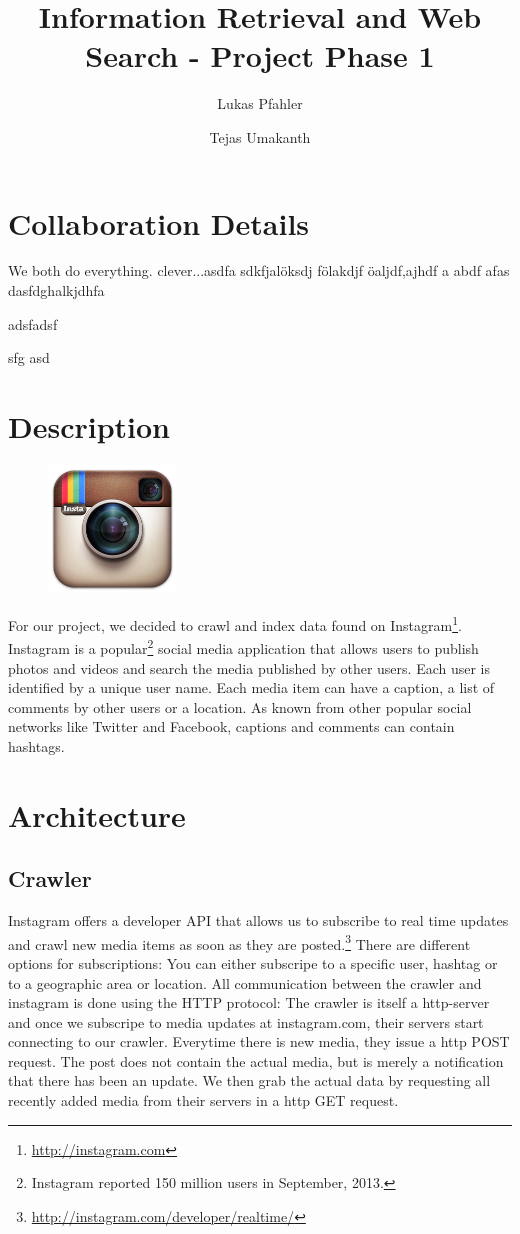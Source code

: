 \documentclass[11pt]{article}
\title{Information Retrieval and Web Search - Project Phase 1}
\author{Lukas Pfahler \and Tejas Umakanth}
\begin{document}
\maketitle
\section{Collaboration Details}
	We both do everything. clever...asdfa sdkfjalöksdj fölakdjf öaljdf,ajhdf a abdf afas
	dasfdghalkjdhfa


	adsfadsf

	sfg
	asd
\section{Description}
	\begin{figure}
  		\vspace{-0.6cm}
  		\includegraphics[width=3.4cm,height=3.4cm]{logo.png}
	\end{figure}
	For our project, we decided to crawl and index data found on Instagram\footnote{\url{http://instagram.com}}. Instagram is a popular\footnote{Instagram reported 150 million users in September, 2013.} social media application that allows users to publish photos and videos and search the media published by other users. Each user is identified by a unique user name. Each media item can have a caption, a list of comments by other users or a location. As known from other popular social networks like Twitter and Facebook, captions and comments can contain hashtags.
\section{Architecture}
	\subsection{Crawler}
		Instagram offers a developer API that allows us to subscribe to real time updates and crawl new media items as soon as they are posted.\footnote{\url{http://instagram.com/developer/realtime/}} There are different options for subscriptions: You can either subscripe to a specific user, hashtag or to a geographic area or location. All communication between the crawler and instagram is done using the HTTP protocol: The crawler is itself a http-server and once we subscripe to media updates at instagram.com, their servers start connecting to our crawler. Everytime there is new media, they issue a http POST request. The post does not contain the actual media, but is merely a notification that there has been an update. We then grab the actual data by requesting all recently added media from their servers in a http GET request.
\end{document}
